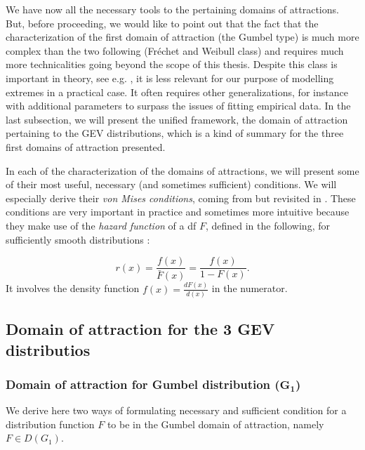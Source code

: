 \documentclass[11pt,a4paper,openany ]{book}
\begin{document}
We have now all the necessary tools to  the pertaining domains of attractions. But, before proceeding, we would like to point out that the fact that the characterization of the first domain of attraction (the Gumbel type)  is much more complex than the two following (Fréchet and Weibull class) and requires much more technicalities going beyond the scope of this thesis. Despite this class is important in theory, see e.g. \cite{pinheiro_comparative_2015}, it is less relevant for our purpose of modelling extremes in a practical case. It often requires other generalizations, for instance with additional parameters to surpass the issues of fitting empirical data. In the last subsection, we will present the unified framework, the domain of attraction pertaining to the GEV distributions, which is a kind of summary for the three first domains of attraction presented.


In each of the characterization of the domains of attractions, we will present some of their most useful, necessary (and sometimes sufficient) conditions. We will especially derive their \emph{von Mises conditions}, coming from \cite{von_mises_distribution_1936} but revisited in \cite{falk_von_1993}. These conditions are very important in practice and sometimes more intuitive because they make use of the \emph{hazard function} of a df $F$, defined in the following, for sufficiently smooth distributions :

\begin{equation}\label{haz}
r(x)=\frac{f(x)}{\bar{F}(x)}= \frac{f(x)}{1-F(x)}.
\end{equation}
It involves the density function $f(x)=\frac{dF(x)}{d(x)}$ in the numerator.

\subsection{Domain of attraction for the 3 GEV distributios}


\subsubsection*{Domain of attraction for Gumbel distribution ($\mathbf{G_1}$) }  We derive here two ways of formulating necessary and sufficient condition for a distribution function $F$ to be in the Gumbel domain of attraction, namely $F\in D(G_1)$.
\end{document}
